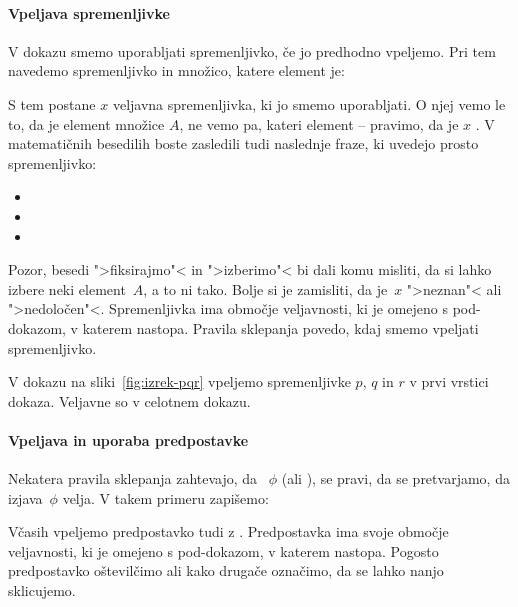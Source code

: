 \paragraph*{Vpeljava spremenljivke}
%
V dokazu smemo uporabljati spremenljivko, če jo predhodno vpeljemo. Pri tem navedemo spremenljivko in množico, katere element je:
%
\begin{quote}
\end{quote}
%
S tem postane $x$ veljavna spremenljivka, ki jo smemo uporabljati.
%
O njej vemo le to, da je element množice $A$, ne vemo pa, kateri element -- pravimo, da je $x$ . V matematičnih besedilih boste zasledili tudi naslednje fraze, ki uvedejo prosto spremenljivko:
%
\begin{itemize}
\item {}
\item {}
\item {}
\end{itemize}
%
Pozor, besedi ">fiksirajmo"< in ">izberimo"< bi dali komu misliti, da si lahko izbere neki element~$A$, a to ni tako.
%
Bolje si je zamisliti, da je~$x$ ">neznan"< ali ">nedoločen"<.
%
Spremenljivka ima območje veljavnosti, ki je omejeno s pod-dokazom, v katerem nastopa.
%
Pravila sklepanja povedo, kdaj smemo vpeljati spremenljivko.

\begin{zgled}
  V dokazu na sliki~\ref{fig:izrek-pqr} vpeljemo spremenljivke $p$, $q$ in $r$ v prvi vrstici dokaza. Veljavne so v celotnem dokazu.
\end{zgled}

\paragraph*{Vpeljava in uporaba predpostavke}
\label{sec:vpelj-predp}

Nekatera pravila sklepanja zahtevajo, da ~$\phi$ (ali ), se pravi, da se pretvarjamo, da izjava~$\phi$ velja. V takem primeru zapišemo:
%
\begin{quote}
\end{quote}
%
Včasih vpeljemo predpostavko tudi z .
%
Predpostavka ima svoje območje veljavnosti, ki je omejeno s pod-dokazom, v katerem nastopa.
%
Pogosto predpostavko oštevilčimo ali kako drugače označimo, da se lahko nanjo sklicujemo.

